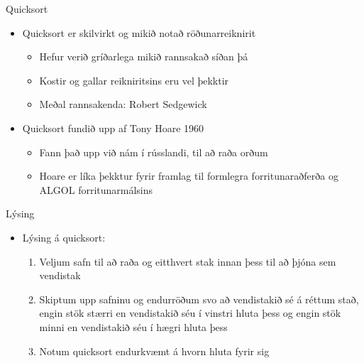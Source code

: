 \documentclass[handout]{beamer}
\begin{document}
\begin{frame}{Quicksort}
	\begin{itemize}
		\item Quicksort er skilvirkt og mikið notað röðunarreiknirit
		      \begin{itemize}
			      \item Hefur verið gríðarlega mikið rannsakað síðan þá
			      \item Kostir og gallar reikniritsins eru vel þekktir
			      \item Meðal rannsakenda: Robert Sedgewick
		      \end{itemize}
		\item Quicksort fundið upp af Tony Hoare 1960
		      \begin{itemize}
			      \item Fann það upp við nám í rússlandi, til að raða orðum
			      \item Hoare er líka þekktur fyrir framlag til formlegra forritunaraðferða og ALGOL forritunarmálsins
		      \end{itemize}
	\end{itemize}
\end{frame}

\begin{frame}{Lýsing}
	\begin{itemize}
		\item Lýsing á quicksort:
		      \begin{enumerate}
			      \item Veljum safn til að raða og eitthvert stak innan þess til að þjóna sem vendistak 
			      \item Skiptum upp  safninu og endurröðum svo að vendistakið sé á réttum stað, engin stök stærri en vendistakið séu í vinstri hluta þess og engin stök minni en vendistakið séu í hægri hluta þess
			      \item Notum quicksort endurkvæmt á hvorn hluta fyrir sig
		      \end{enumerate}
	\end{itemize}
\end{frame}
\end{document}
